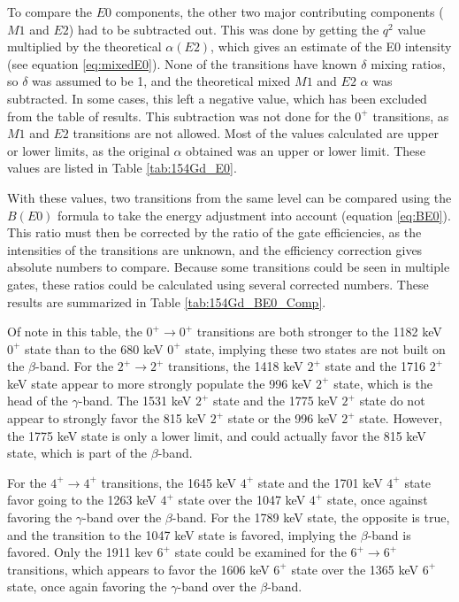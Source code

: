 To compare the $E0$ components, the other two major contributing components ($M1$ and $E2$) had to be subtracted out. This was done by getting the $q^2$ value multiplied by the theoretical $\alpha(E2)$, which gives an estimate of the E0 intensity (see equation \ref{eq:mixedE0}). None of the transitions have known $\delta$ mixing ratios, so $\delta$ was assumed to be 1, and the theoretical mixed $M1$ and $E2$ $\alpha$ was subtracted. In some cases, this left a negative value, which has been excluded from the table of results. This subtraction was not done for the $0^+$ transitions, as $M1$ and $E2$ transitions are not allowed. Most of the values calculated are upper or lower limits, as the original $\alpha$ obtained was an upper or lower limit. These values are listed in Table \ref{tab:154Gd_E0}.

With these values, two transitions from the same level can be compared using the $B(E0)$ formula to take the energy adjustment into account (equation \ref{eq:BE0}). This ratio must then be corrected by the ratio of the gate efficiencies, as the intensities of the transitions are unknown, and the efficiency correction gives absolute numbers to compare. Because some transitions could be seen in multiple gates, these ratios could be calculated using several corrected numbers. These results are summarized in Table \ref{tab:154Gd_BE0_Comp}.

\afterpage{\clearpage}

\afterpage{\clearpage}

Of note in this table, the $0^+\rightarrow0^+$ transitions are both stronger to the 1182 keV $0^+$ state than to the 680 keV $0^+$ state, implying these two states are not built on the $\beta$-band. For the $2^+\rightarrow2^+$ transitions, the 1418 keV $2^+$ state and the 1716 $2^+$ keV state appear to more strongly populate the 996 keV $2^+$ state, which is the head of the $\gamma$-band. The 1531 keV $2^+$ state and the 1775 keV $2^+$ state do not appear to strongly favor the 815 keV $2^+$ state or the 996 keV $2^+$ state. However, the 1775 keV state is only a lower limit, and could actually favor the 815 keV state, which is part of the $\beta$-band.

For the $4^+\rightarrow4^+$ transitions, the 1645 keV $4^+$ state and the 1701 keV $4^+$ state favor going to the 1263 keV $4^+$ state over the 1047 keV $4^+$ state, once against favoring the $\gamma$-band over the $\beta$-band. For the 1789 keV state, the opposite is true, and the transition to the 1047 keV state is favored, implying the $\beta$-band is favored. Only the 1911 kev $6^+$ state could be examined for the $6^+\rightarrow6^+$ transitions, which appears to favor the 1606 keV $6^+$ state over the 1365 keV $6^+$ state, once again favoring the $\gamma$-band over the $\beta$-band.

